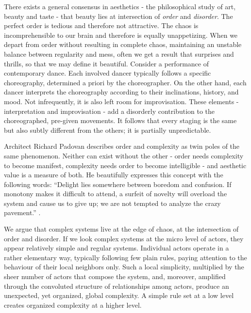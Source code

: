 \documentclass{article}
\begin{document}
There exists a general consensus in aesthetics - the philosophical study of art, beauty and taste - that beauty lies at intersection of \textit{order} and \textit{disorder}. The perfect order is tedious and therefore not attractive. The chaos is incomprehensible to our brain and therefore is equally unappetizing. When we depart from order without resulting in complete chaos, maintaining an unstable balance between regularity and mess, often we get a result that surprises and thrills, so that we may define it beautiful. Consider a performance of contemporary dance. Each involved dancer typically follows a specific choreography, determined a priori by the choreographer. On the other hand, each dancer interprets the choreography according to their inclinations, history, and mood. Not infrequently, it is also left room for improvisation. These elements - interpretation and improvisation - add a disorderly contribution to the choreographed, pre-given movements. It follows that every staging is the same but also subtly different from the others; it is partially unpredictable. 

Architect Richard Padovan describes order and complexity as twin poles of the same phenomenon. Neither can exist without the other - order needs complexity to become manifest, complexity needs order to become intelligible - and aesthetic value is a measure of both. He beautifully expresses this concept with the following words: ``Delight lies somewhere between boredom and confusion. If monotony makes it difficult to attend, a surfeit of novelty will overload the system and cause us to give up; we are not tempted to analyze the crazy pavement.'' \cite{P02}. 

We argue that complex systems live at the edge of chaos, at the intersection of order and disorder. If we look complex systems at the micro level of actors, they appear relatively simple and regular systems. Individual actors operate in a rather elementary way, typically following few plain rules, paying attention to the behaviour of their local neighbors only. Such a local simplicity, multiplied by the sheer number of actors that compose the system, and, moreover, amplified through the convoluted structure of relationships among actors, produce an unexpected, yet organized, global complexity. A simple rule set at a low level creates organized complexity at a higher level. 
\end{document}
